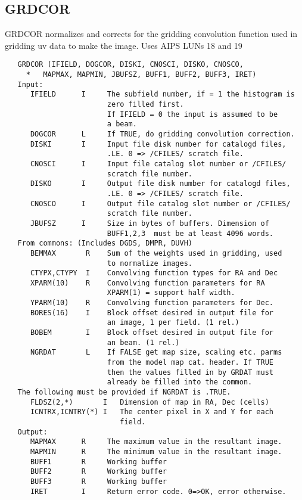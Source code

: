 \subsection{GRDCOR}
GRDCOR normalizes and corrects for the gridding convolution
function used in gridding uv data to make the image.
Uses AIPS LUNs 18 and 19
\begin{verbatim}
   GRDCOR (IFIELD, DOGCOR, DISKI, CNOSCI, DISKO, CNOSCO,
     *   MAPMAX, MAPMIN, JBUFSZ, BUFF1, BUFF2, BUFF3, IRET)
   Input:
      IFIELD      I     The subfield number, if = 1 the histogram is
                        zero filled first.
                        If IFIELD = 0 the input is assumed to be
                        a beam.
      DOGCOR      L     If TRUE, do gridding convolution correction.
      DISKI       I     Input file disk number for catalogd files,
                        .LE. 0 => /CFILES/ scratch file.
      CNOSCI      I     Input file catalog slot number or /CFILES/
                        scratch file number.
      DISKO       I     Output file disk number for catalogd files,
                        .LE. 0 => /CFILES/ scratch file.
      CNOSCO      I     Output file catalog slot number or /CFILES/
                        scratch file number.
      JBUFSZ      I     Size in bytes of buffers. Dimension of
                        BUFF1,2,3  must be at least 4096 words.
   From commons: (Includes DGDS, DMPR, DUVH)
      BEMMAX       R    Sum of the weights used in gridding, used
                        to normalize images.
      CTYPX,CTYPY  I    Convolving function types for RA and Dec
      XPARM(10)    R    Convolving function parameters for RA
                        XPARM(1) = support half width.
      YPARM(10)    R    Convolving function parameters for Dec.
      BORES(16)    I    Block offset desired in output file for
                        an image, 1 per field. (1 rel.)
      BOBEM        I    Block offset desired in output file for
                        an beam. (1 rel.)
      NGRDAT       L    If FALSE get map size, scaling etc. parms
                        from the model map cat. header. If TRUE
                        then the values filled in by GRDAT must
                        already be filled into the common.
   The following must be provided if NGRDAT is .TRUE.
      FLDSZ(2,*)       I   Dimension of map in RA, Dec (cells)
      ICNTRX,ICNTRY(*) I   The center pixel in X and Y for each
                           field.
   Output:
      MAPMAX      R     The maximum value in the resultant image.
      MAPMIN      R     The minimum value in the resultant image.
      BUFF1       R     Working buffer
      BUFF2       R     Working buffer
      BUFF3       R     Working buffer
      IRET        I     Return error code. 0=>OK, error otherwise.
\end{verbatim}



